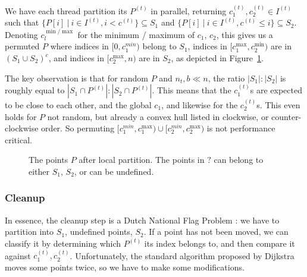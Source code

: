 We have each thread partition its $P^{(t)}$ in parallel, returning 
$c_{1}^{(t)}, c_{2}^{(t)} \in I^{(t)}$ such that
$\{P[i] \ | \ i \in I^{(t)}, i < c^{(t)}\} \subseteq S_1$
and $\{P[i] \ | \ i \in I^{(t)}, c^{(t)} \leq i\} \subseteq S_2$.
Denoting $c_{l}^{\min / \max}$ for the minimum / maximum of $c_1$, $c_2$, this
gives us a permuted $P$ where indices in $[0, c_1^{min})$ belong to $S_1$,
indices in $[c_{1}^{\max}, c_2^{\min})$ are in $(S_1 \cup S_2)^c$, and
indices in $[c_2^{\max}, n)$ are in $S_2$, as depicted in 
Figure~\ref{fig:local_part}.

The key observation is that for random $P$ and $n_t, b \ll n$, the ratio 
$|S_1| : |S_2|$ is roughly equal to $|S_1 \cap P^{(t)}| : |S_2 \cap P^{(t)}|$.
This means that the $c_1^{(t)}$s are expected to be close to each other, and
the global $c_1$, and likewise for the $c_2^{(t)}$s. This even holds for $P$
not random, but already a convex hull listed in clockwise, or counter-clockwise
order. So permuting $[c_1^{min}, c_1^{\max}) \cup [c_2^{min}, c_2^{\max})$
is not performance critical.

\begin{figure}[ht]
    \caption{The points $P$ after local partition. The points in $?$ can
             belong to either $S_1$, $S_2$, or can be undefined.}
    \label{fig:local_part}
\end{figure}

\subsubsection{Cleanup}


In essence, the cleanup step is a Dutch National Flag Problem \cite{}: 
we have to partition into $S_1$, undefined points, $S_2$. If a point has not 
been moved, we can classify it by determining which $P^{(t)}$ its index belongs 
to, and then compare it against $c_1^{(t)}, c_2^{(t)}$. Unfortunately, the
standard algorithm proposed by Dijkstra moves some points twice, so we have
to make some modifications.

